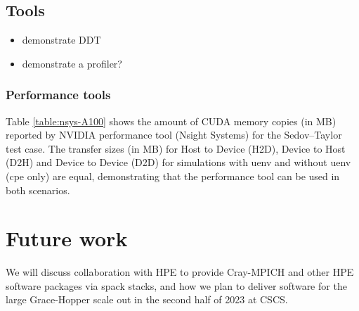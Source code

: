 \subsection{Tools}


\begin{itemize}
    \item demonstrate DDT
    \item demonstrate a profiler?
\end{itemize}

\subsubsection{Performance tools}
\begin{table}
\centering
\caption{}
\label{table:nsys-A100}
\end{table}

Table \ref{table:nsys-A100} shows the amount of CUDA memory copies (in MB) reported by NVIDIA performance tool (Nsight Systems) for the Sedov--Taylor test case.
The transfer sizes (in MB) for Host to Device (H2D), Device to Host (D2H) and Device to Device (D2D) for simulations with uenv and without uenv (cpe only) are equal, demonstrating that the performance tool can be used in both scenarios.

\section{Future work}

We will discuss collaboration with HPE to provide Cray-MPICH and other HPE software packages via spack stacks, and how we plan to deliver software for the large Grace-Hopper scale out in the second half of 2023 at CSCS.

